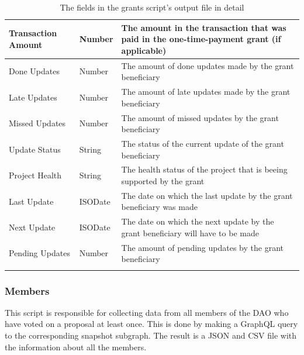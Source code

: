 \documentclass[MSE,Master,english]{twbook}%
\begin{document}
\begin{xltabular}{\textwidth}{|l|l|X|}
  Transaction Amount & Number & The amount in the transaction that was paid in the one-time-payment grant (if applicable)           \\ \hline
  Done Updates                   & Number  & The amount of done updates made by the grant beneficiary                               \\ \hline
  Late Updates                   & Number  & The amount of late updates made by the grant beneficiary                               \\ \hline
  Missed Updates                 & Number  & The amount of missed updates by the grant beneficiary                                  \\ \hline
  Update Status                  & String  & The status of the current update of the grant beneficiary                              \\ \hline
  Project Health                 & String  & The health status of the project that is beeing supported by the grant                 \\ \hline
  Last Update                    & ISODate & The date on which the last update by the grant beneficiary was made                    \\ \hline
  Next Update                    & ISODate & The date on which the next update by the grant beneficiary will have to be made        \\ \hline
  Pending Updates                & Number  & The amount of pending updates by the grant beneficiary                                 \\ \hline
  \caption{The fields in the grants script's output file in detail}
  \label{table:grants}
\end{xltabular}

\subsubsection{Members}
This script is responsible for collecting data from all members of the \gls{DAO} who have voted on a proposal at least once. This is done by making a GraphQL query to the corresponding snapshot subgraph. The result is a JSON and CSV file with the information about all the members. \\
\end{document}
